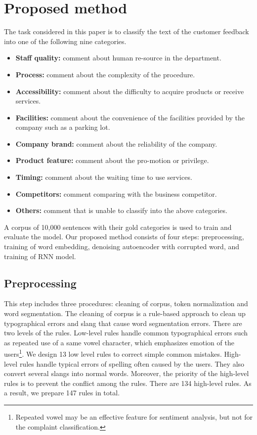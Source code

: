 \setlength{\parindent}{0.5cm}
\section{Proposed method}
The task considered in this paper is to classify the text of 
the customer feedback into one of the following nine categories.
\begin{itemize}
    \item \textbf{Staff quality:} comment about human re-source in the department.
    \item \textbf{Process:} comment about the complexity of the procedure.
    \item \textbf{Accessibility:} comment about the difficulty to acquire products or receive services.
    \item \textbf{Facilities:} comment about the convenience of the facilities provided by the company such as a parking lot.
    \item \textbf{Company brand:} comment about the reliability of the company. 
    \item \textbf{Product feature:} comment about the pro-motion or privilege. 
    \item \textbf{Timing:} comment about the waiting time to use services.
    \item \textbf{Competitors:} comment comparing with the business competitor.
    \item \textbf{Others:} comment that is unable to classify into the above categories. 
\end{itemize}
A corpus of 10,000 sentences with their gold categories is used to train and
evaluate the model. 
Our proposed method consists of four steps: preprocessing, 
training of word embedding, denoising autoencoder with corrupted word,
and training of RNN model.

\subsection{Preprocessing}
This step includes three procedures: cleaning of corpus, 
token normalization and word segmentation. The cleaning of corpus is a rule-based 
approach to clean up typographical errors and slang that cause word segmentation errors. 
There are two levels of the rules. 
Low-level rules handle common typographical errors such as repeated use 
of a same vowel character, which emphasizes emotion of the users\footnote{Repeated vowel may be an effective feature for sentiment analysis, but not for the complaint classification.}.
We design 13 low level rules to correct simple common mistakes. 
High-level rules handle typical errors of spelling often caused by the users. 
They also convert several slangs into normal words.
Moreover, the priority of the high-level rules is to prevent the conflict among the rules. 
There are 134 high-level rules. As a result, we prepare 147 rules in total.


